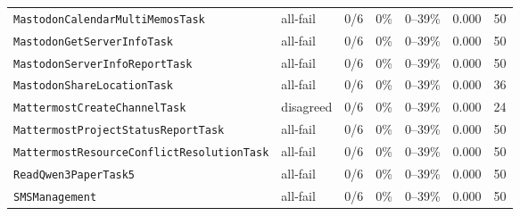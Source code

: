 \begin{tabular}{llccccc}
\texttt{MastodonCalendarMultiMemosTask} & all-fail & 0/6 & 0\% & 0--39\% & 0.000 & 50 \\
\texttt{MastodonGetServerInfoTask} & all-fail & 0/6 & 0\% & 0--39\% & 0.000 & 50 \\
\texttt{MastodonServerInfoReportTask} & all-fail & 0/6 & 0\% & 0--39\% & 0.000 & 50 \\
\texttt{MastodonShareLocationTask} & all-fail & 0/6 & 0\% & 0--39\% & 0.000 & 36 \\
\texttt{MattermostCreateChannelTask} & disagreed & 0/6 & 0\% & 0--39\% & 0.000 & 24 \\
\texttt{MattermostProjectStatusReportTask} & all-fail & 0/6 & 0\% & 0--39\% & 0.000 & 50 \\
\texttt{MattermostResourceConflictResolutionTask} & all-fail & 0/6 & 0\% & 0--39\% & 0.000 & 50 \\
\texttt{ReadQwen3PaperTask5} & all-fail & 0/6 & 0\% & 0--39\% & 0.000 & 50 \\
\texttt{SMSManagement} & all-fail & 0/6 & 0\% & 0--39\% & 0.000 & 50 \\
\bottomrule
\end{tabular}
